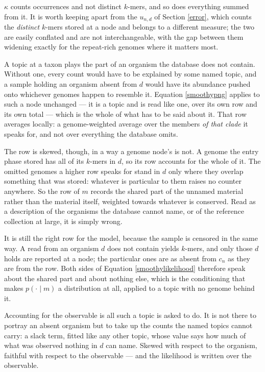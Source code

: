 \documentclass[pdflatex,sn-vancouver-num]{sn-jnl}
\begin{document}
    $\kappa$ counts occurrences and not distinct $k$-mers, and so does everything summed from it. It is worth keeping apart
    from the $u_{n,d}$ of Section \ref{error}, which counts the \emph{distinct} $k$-mers stored at a
    node and belongs to a different measure; the two are easily conflated and are not
    interchangeable, with the gap between them widening exactly for the repeat-rich genomes where it
    matters most.

    A topic at a taxon plays the part of an organism the database does not contain. Without
    one, every count would have to be explained by some named topic, and a sample holding an organism
    absent from $d$ would have its abundance pushed onto whichever genomes happen to resemble it.
    Equation \eqref{smoothypng} applies to such a node unchanged --- it is a topic and is read like
    one, over its own row and its own total --- which is the whole of what has to be said about it.
    That row averages locally: a genome-weighted average over the members \emph{of that clade} it
    speaks for, and not over everything the database omits.

    The row is skewed, though, in a way a genome node's is not. A genome the entry phase stored has
    all of its $k$-mers in $d$, so its row accounts for the whole of it. The omitted genomes a higher
    row speaks for stand in $d$ only where they overlap something that was stored: whatever is
    particular to them raises no counter anywhere. So the row of $m$ records the shared part of the
    unnamed material rather than the material itself, weighted towards whatever is conserved. Read as a description of the organisms
    the database cannot name, or of the reference collection at large, it is simply wrong.

    It is still the right row for the model, because the sample is censored in the same way. A
    read from an organism $d$ does not contain yields $k$-mers, and only those $d$ holds are reported
    at a node; the particular ones are as absent from $c_n$ as they are from the row. Both sides of
    Equation \eqref{smoothylikelihood} therefore speak about the shared part and about nothing else,
    which is the conditioning that makes $p(\cdot \mid m)$ a distribution at all, applied to a topic
    with no genome behind it.

    Accounting for the observable is all such a topic is asked to do. It is not
    there to portray an absent organism but to take up the counts the named topics cannot carry: a
    slack term, fitted like any other topic, whose value says how much of what was observed nothing
    in $d$ can name. Skewed with respect to the organism, faithful with respect to the observable ---
    and the likelihood is written over the observable.
\end{document}
